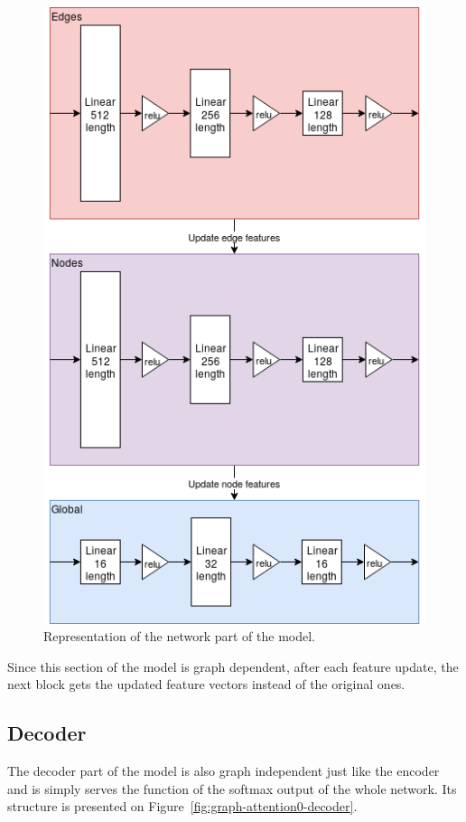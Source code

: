 \begin{figure}[!ht]
	\centering
	\includegraphics[scale=0.5]{figures/GA0_network.png}
	\caption{Representation of the network part of the model.}
	\label{fig:graph-attention0-network}
\end{figure}

Since this section of the model is graph dependent, after each feature update, the next block gets the updated feature vectors instead of the original ones.

\subsection{Decoder}

The decoder part of the model is also graph independent just like the encoder and is simply serves the function of the softmax output of the whole network. Its structure is presented on Figure~\ref{fig:graph-attention0-decoder}.

